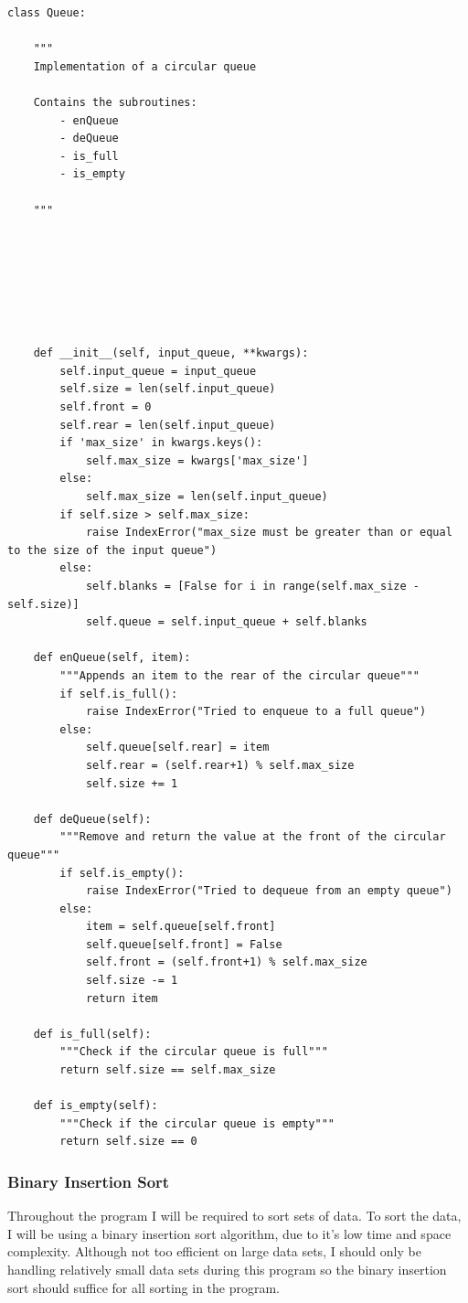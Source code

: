 \documentclass[12pt]{article}
\begin{document}
\begin{lstlisting}
class Queue:

    """
    Implementation of a circular queue

    Contains the subroutines:
        - enQueue
        - deQueue
        - is_full
        - is_empty

    """







    def __init__(self, input_queue, **kwargs):
        self.input_queue = input_queue
        self.size = len(self.input_queue)
        self.front = 0
        self.rear = len(self.input_queue)
        if 'max_size' in kwargs.keys():
            self.max_size = kwargs['max_size']
        else:
            self.max_size = len(self.input_queue)
        if self.size > self.max_size:
            raise IndexError("max_size must be greater than or equal to the size of the input queue")
        else:
            self.blanks = [False for i in range(self.max_size - self.size)]
            self.queue = self.input_queue + self.blanks

    def enQueue(self, item):
        """Appends an item to the rear of the circular queue"""
        if self.is_full():
            raise IndexError("Tried to enqueue to a full queue")
        else:
            self.queue[self.rear] = item
            self.rear = (self.rear+1) % self.max_size
            self.size += 1

    def deQueue(self):
        """Remove and return the value at the front of the circular queue"""
        if self.is_empty():
            raise IndexError("Tried to dequeue from an empty queue")
        else:
            item = self.queue[self.front]
            self.queue[self.front] = False
            self.front = (self.front+1) % self.max_size
            self.size -= 1
            return item

    def is_full(self):
        """Check if the circular queue is full"""
        return self.size == self.max_size

    def is_empty(self):
        """Check if the circular queue is empty"""
        return self.size == 0
\end{lstlisting}

\clearpage
\subsubsection{Binary Insertion Sort}
Throughout the program I will be required to sort sets of data. To sort the data, I will be using a binary insertion sort algorithm, due to it's low time and space complexity. Although not too efficient on large data sets, I should only be handling relatively small data sets during this program so the binary insertion sort should suffice for all sorting in the program.
\end{document}
